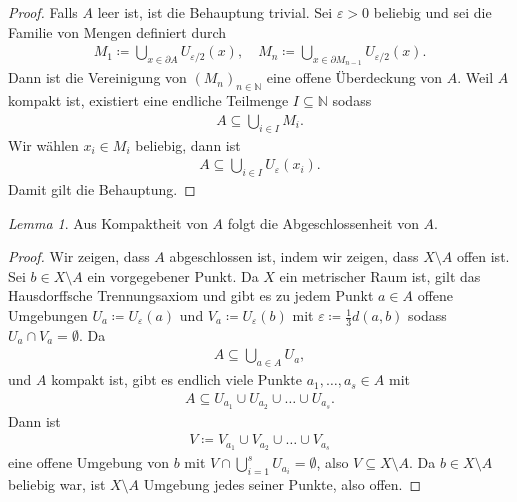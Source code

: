 \documentclass[draft,a5paper]{article}
\theoremstyle{remark}
\newtheorem*{lem}{Lemma}
\begin{document}
\begin{proof}
  Falls \(A\) leer ist, ist die Behauptung trivial.  Sei
  \(\varepsilon > 0\) beliebig und sei die Familie von Mengen definiert durch
  \begin{align*}
    M_{1} \coloneq \bigcup_{x \in \partial A} U_{\varepsilon/2}(x), \quad
    M_{n} \coloneq \bigcup_{x \in \partial M_{n - 1}}U_{\varepsilon/2}(x).
  \end{align*}
  Dann ist die Vereinigung von \((M_{n})_{n \in \mathbb{N}}\) eine offene
  Überdeckung von \(A\).  Weil \(A\) kompakt ist, existiert eine
  endliche Teilmenge \(I \subseteq \mathbb{N}\) sodass
  \begin{align*}
    A \subseteq \bigcup_{i \in I}{M_{i}}.
  \end{align*}
  Wir wählen \(x_{i} \in M_{i}\) beliebig, dann ist
  \begin{align*}
    A \subseteq \bigcup_{i \in I}{U_{\varepsilon}(x_{i})}.
  \end{align*}
  Damit gilt die Behauptung.
\end{proof}

\begin{lem}
  Aus Kompaktheit von \(A\) folgt die Abgeschlossenheit von \(A\).
\end{lem}

\begin{proof}
  Wir zeigen, dass \(A\) abgeschlossen ist, indem wir zeigen, dass \(X
  \setminus A\) offen ist.  Sei \(b \in X \setminus A\) ein vorgegebener Punkt.  Da
  \(X\) ein metrischer Raum ist, gilt das Hausdorffsche Trennungsaxiom
  und gibt es zu jedem Punkt \(a \in A\) offene Umgebungen \(U_{a} \coloneq
  U_{\varepsilon}(a)\) und \(V_{a} \coloneq U_{\varepsilon}(b)\) mit \(\varepsilon \coloneq \frac{1}{3}d(a, b)\)
  sodass \(U_{a} \cap V_{a} = \emptyset\).  Da
  \begin{align*}
    A \subseteq \bigcup_{a \in A}{U_{a}},
  \end{align*}
  und \(A\) kompakt ist, gibt es endlich viele Punkte \(a_{1},\ldots, a_{s}
  \in A\) mit
  \begin{align*}
    A \subseteq U_{a_{1}} \cup U_{a_{2}} \cup \ldots \cup U_{a_{s}}.
  \end{align*}
  Dann ist
  \begin{align*}
    V \coloneq V_{a_{1}} \cup V_{a_{2}} \cup \ldots \cup V_{a_{s}}
  \end{align*}
  eine offene Umgebung von \(b\) mit \(V \cap \bigcup_{i=1}^{s}{U_{a_{i}}} =
  \emptyset\), also \(V \subseteq X \setminus A\).  Da \(b \in X \setminus A\) beliebig war, ist \(X \setminus
  A\) Umgebung jedes seiner Punkte, also offen.
\end{proof}
\end{document}
